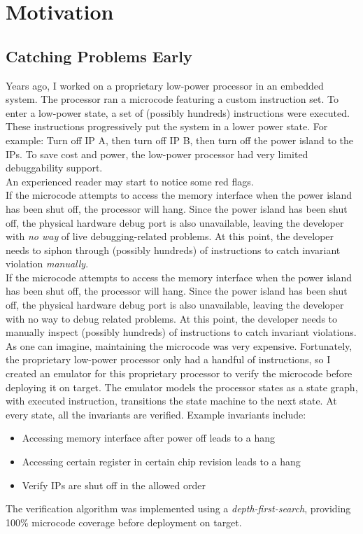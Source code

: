\chapter{Motivation}

\section{Catching Problems Early} 

Years ago, I worked on a proprietary low-power processor in an embedded
system. The processor ran a microcode featuring a custom instruction set. To
enter a low-power state, a set of (possibly hundreds) instructions were
executed. These instructions progressively put the system in a lower power state.
For example: Turn off IP A, then turn off IP B, then turn off the power island
to the IPs. To save cost and power, the low-power processor had very limited
debuggability support.\\

An experienced reader may start to notice some red flags.\\

If the microcode attempts to access the memory interface when the power
island has been shut off, the processor will hang. Since the power island has
been shut off, the physical hardware debug port is also unavailable, leaving the
developer with \textit{no way} of live debugging-related problems. At this point,
the developer needs to siphon through (possibly hundreds) of instructions to
catch invariant violation \textit{manually}.\\

If the microcode attempts to access the memory interface when the power
island has been shut off, the processor will hang. Since the power island has
been shut off, the physical hardware debug port is also unavailable, leaving
the developer with no way to debug related problems. At this point, the
developer needs to manually inspect (possibly hundreds) of instructions to catch
invariant violations.\\

As one can imagine, maintaining the microcode was very expensive.
Fortunately, the proprietary low-power processor only had a handful of
instructions, so I created an emulator for this proprietary processor to verify
the microcode before deploying it on target. The emulator models the processor
states as a state graph, with executed instruction, transitions the state machine
to the next state. At every state, all the invariants are verified. Example
invariants include:
\begin{itemize} 
    \item Accessing memory interface after power off leads to a hang 
    \item Accessing certain register in certain chip revision leads to a hang 
    \item Verify IPs are shut off in the allowed order
\end{itemize}
The verification algorithm was implemented using a \textit{depth-first-search},
providing 100\% microcode coverage before deployment on target.\\

